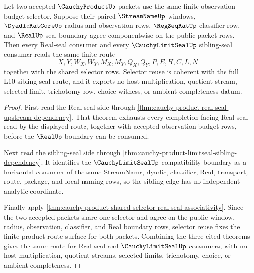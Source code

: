 \begin{theorem}
\label{thm:cauchy-product-real-seal-selector-coherence}
Let two accepted $\CauchyProductUp$ packets use the same finite
observation-budget selector. Suppose their paired $\StreamNameUp$ windows,
$\DyadicRatCoreUp$ radius and observation rows, $\RegSeqRatUp$ classifier row,
and $\RealUp$ seal boundary agree componentwise on the public packet rows. Then
every Real-seal consumer and every $\CauchyLimitSealUp$ sibling-seal consumer
reads the same finite route
$$
X,Y,W_X,W_Y,M_X,M_Y,Q_X,Q_Y,P,E,H,C,L,N
$$
together with the shared selector rows. Selector reuse is coherent with the full
L10 sibling seal route, and it exports no host multiplication, quotient stream,
selected limit, trichotomy row, choice witness, or ambient completeness datum.
\end{theorem}
\begin{proof}
First read the Real-seal side through
\autoref{thm:cauchy-product-real-seal-upstream-dependency}. That theorem
exhausts every completion-facing Real-seal read by the displayed route, together
with accepted observation-budget rows, before the $\RealUp$ boundary can be
consumed.

Next read the sibling-seal side through
\autoref{thm:cauchy-product-limitseal-sibling-dependency}. It identifies the
$\CauchyLimitSealUp$ compatibility boundary as a horizontal consumer of the same
StreamName, dyadic, classifier, Real, transport, route, package, and local naming
rows, so the sibling edge has no independent analytic coordinate.

Finally apply
\autoref{thm:cauchy-product-shared-selector-real-seal-associativity}. Since the
two accepted packets share one selector and agree on the public window, radius,
observation, classifier, and Real boundary rows, selector reuse fixes the finite
product-route surface for both packets. Combining the three cited theorems gives
the same route for Real-seal and $\CauchyLimitSealUp$ consumers, with no host
multiplication, quotient streams, selected limits, trichotomy, choice, or ambient
completeness.
\end{proof}

